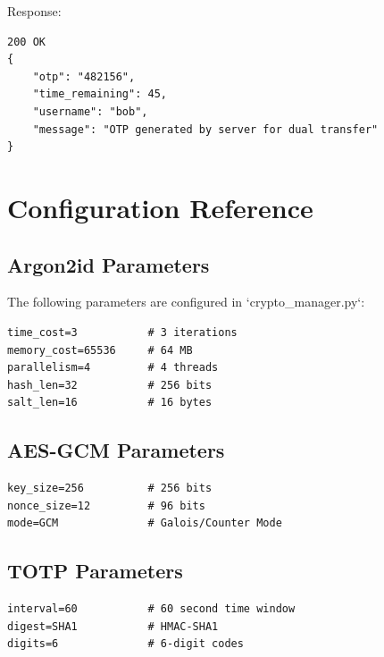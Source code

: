 \documentclass[12pt,a4paper]{report}
\begin{document}
Response:
\begin{lstlisting}
200 OK
{
    "otp": "482156",
    "time_remaining": 45,
    "username": "bob",
    "message": "OTP generated by server for dual transfer"
}
\end{lstlisting}

\chapter{Configuration Reference}

\section{Argon2id Parameters}

The following parameters are configured in `crypto_manager.py`:

\begin{lstlisting}
time_cost=3           # 3 iterations
memory_cost=65536     # 64 MB
parallelism=4         # 4 threads
hash_len=32           # 256 bits
salt_len=16           # 16 bytes
\end{lstlisting}

\section{AES-GCM Parameters}

\begin{lstlisting}
key_size=256          # 256 bits
nonce_size=12         # 96 bits
mode=GCM              # Galois/Counter Mode
\end{lstlisting}

\section{TOTP Parameters}

\begin{lstlisting}
interval=60           # 60 second time window
digest=SHA1           # HMAC-SHA1
digits=6              # 6-digit codes
\end{lstlisting}
\end{document}
